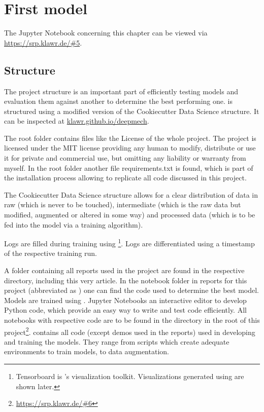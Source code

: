 \section{First model}

The Jupyter Notebook concerning this chapter can be viewed via \url{https://srp.klawr.de/\#5}.

\subsection{Structure}
The project structure is an important part of efficiently testing models and evaluation them against another to determine the best performing one.
 is structured using a modified version of the Cookiecutter Data Science \cite{drivendata2019} structure. It can be inspected at \url{klawr.github.io/deepmech}.

The root folder contains files like the License of the whole project.
The project is licensed under the MIT license providing any human to modify, distribute or use it for private and commercial use, but omitting any liability or warranty from myself.
In the root folder another file requirements.txt is found, which is part of the installation process allowing to replicate all code discussed in this project.

The Cookiecutter Data Science structure allows for a clear distribution of data in raw (which is never to be touched), intermediate (which is the raw data but modified, augmented or altered in some way) and processed data (which is to be fed into the model via a training algorithm).

Logs are filled during training using \footnote{Tensorboard is 's visualization toolkit. Visualizations generated using  are shown later.}. Logs are differentiated using a timestamp of the respective training run.


A folder containing all reports used in the project are found in the respective directory, including this very article.
In the notebook folder in reports for this project (abbreviated as ) one can find the code used to determine the best model.
Models are trained using  \cite{Jupyter2019}.
Jupyter Notebooks an interactive editor to develop Python code, which provide an easy way to write and test code efficiently.
All notebooks with respective code are to be found in the  directory in the root of this project\footnote{\url{https://srp.klawr.de/\#6}}.
 contains all code (except demos used in the reports) used in developing and training the models. They range from scripts which create adequate environments to train models, to data augmentation.

